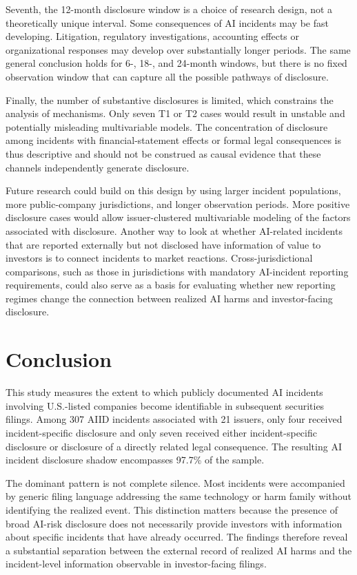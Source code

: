 \documentclass[utf8]{FrontiersinHarvard}
\begin{document}
Seventh, the 12-month disclosure window is a choice of research design, not a theoretically unique interval. Some consequences of AI incidents may be fast developing. Litigation, regulatory investigations, accounting effects or organizational responses may develop over substantially longer periods. The same general conclusion holds for 6-, 18-, and 24-month windows, but there is no fixed observation window that can capture all the possible pathways of disclosure.

Finally, the number of substantive disclosures is limited, which constrains the analysis of mechanisms. Only seven T1 or T2 cases would result in unstable and potentially misleading multivariable models. The concentration of disclosure among incidents with financial-statement effects or formal legal consequences is thus descriptive and should not be construed as causal evidence that these channels independently generate disclosure.

Future research could build on this design by using larger incident populations, more public-company jurisdictions, and longer observation periods. More positive disclosure cases would allow issuer-clustered multivariable modeling of the factors associated with disclosure. Another way to look at whether AI-related incidents that are reported externally but not disclosed have information of value to investors is to connect incidents to market reactions. Cross-jurisdictional comparisons, such as those in jurisdictions with mandatory AI-incident reporting requirements, could also serve as a basis for evaluating whether new reporting regimes change the connection between realized AI harms and investor-facing disclosure.

\section{Conclusion}

This study measures the extent to which publicly documented AI incidents involving U.S.-listed companies become identifiable in subsequent securities filings. Among 307 AIID incidents associated with 21 issuers, only four received incident-specific disclosure and only seven received either incident-specific disclosure or disclosure of a directly related legal consequence. The resulting AI incident disclosure shadow encompasses 97.7\% of the sample.

The dominant pattern is not complete silence. Most incidents were accompanied by generic filing language addressing the same technology or harm family without identifying the realized event. This distinction matters because the presence of broad AI-risk disclosure does not necessarily provide investors with information about specific incidents that have already occurred. The findings therefore reveal a substantial separation between the external record of realized AI harms and the incident-level information observable in investor-facing filings.
\end{document}
